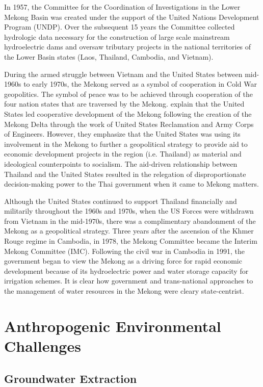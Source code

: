   In 1957, the Committee for the Coordination of Investigations in the Lower Mekong Basin was created under the support of the United Nations Development Program (UNDP). Over the subsequent 15 years the Committee collected hydrologic data necessary for the construction of large scale mainstream hydroelectric dams and oversaw tributary projects in the national territories of the Lower Basin states (Laos, Thailand, Cambodia, and Vietnam).
  
  During the armed struggle between Vietnam and the United States between mid-1960s to early 1970s, the Mekong served as a symbol of cooperation in Cold War geopolitics. The symbol of peace was to be achieved through cooperation of the four nation states that are traversed by the Mekong. \citet{sneddon2006rethinking}  explain that the United States led cooperative development of the Mekong following the creation of the Mekong Delta through the work of United States Reclamation and Army Corps of Engineers. However, they emphasize that the United States was using its involvement in the Mekong to further a geopolitical strategy to provide aid to economic development projects in the region (i.e. Thailand) as material and ideological counterpoints to socialism. The aid-driven relationship between Thailand and the United States resulted in the relegation of disproportionate decision-making power to the Thai government when it came to Mekong matters.
  
  
Although the United States continued to support Thailand financially and militarily throughout the 1960s and 1970s, when the US Forces were withdrawn from Vietnam in the mid-1970s, there was a complimentary abandonment of the Mekong as a geopolitical strategy. Three years after the ascension of the Khmer Rouge regime in Cambodia, in 1978, the Mekong Committee became the Interim Mekong Committee (IMC). Following the civil war in Cambodia in 1991, the government began to view the Mekong as a driving force for rapid economic development because of its hydroelectric power and water storage capacity for irrigation schemes. It is clear how government and trans-national approaches to the management of water resources in the Mekong were cleary state-centrist. 

\section{Anthropogenic Environmental Challenges}

\subsection{Groundwater Extraction}

